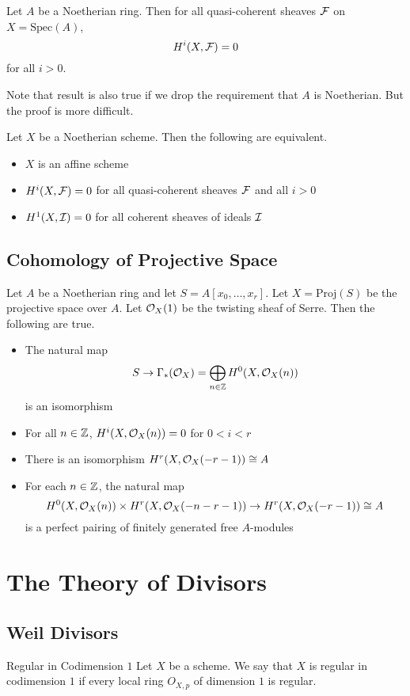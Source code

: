 \documentclass[a4paper]{article}
\begin{document}
\begin{thm}{}{} Let $A$ be a Noetherian ring. Then for all quasi-coherent sheaves $\mathcal{F}$ on $X=\text{Spec}(A)$, $$H^i(X,\mathcal{F})=0$$ for all $i>0$. 
\end{thm}

Note that result is also true if we drop the requirement that $A$ is Noetherian. But the proof is more difficult. 

\begin{thm}{}{} Let $X$ be a Noetherian scheme. Then the following are equivalent. 
\begin{itemize}
\item $X$ is an affine scheme
\item $H^i(X,\mathcal{F})=0$ for all quasi-coherent sheaves $\mathcal{F}$ and all $i>0$
\item $H^1(X,\mathcal{I})=0$ for all coherent sheaves of ideals $\mathcal{I}$
\end{itemize}
\end{thm}

\subsection{Cohomology of Projective Space}
\begin{thm}{}{} Let $A$ be a Noetherian ring and let $S=A[x_0,\dots,x_r]$. Let $X=\text{Proj}(S)$ be the projective space over $A$. Let $\mathcal{O}_X(1)$ be the twisting sheaf of Serre. Then the following are true. 
\begin{itemize}
\item The natural map $$S\to\Gamma_\ast(\mathcal{O}_X)=\bigoplus_{n\in\mathbb{Z}}H^0(X,\mathcal{O}_X(n))$$ is an isomorphism
\item For all $n\in\mathbb{Z}$, $H^i(X,\mathcal{O}_X(n))=0$ for $0<i<r$
\item There is an isomorphism $H^r(X,\mathcal{O}_X(-r-1))\cong A$
\item For each $n\in\mathbb{Z}$, the natural map $$H^0(X,\mathcal{O}_X(n))\times H^r(X,\mathcal{O}_X(-n-r-1))\to H^r(X,\mathcal{O}_X(-r-1))\cong A$$ is a perfect pairing of finitely generated free $A$-modules
\end{itemize}
\end{thm}


\pagebreak
\section{The Theory of Divisors}
\subsection{Weil Divisors}
\begin{defn}{Regular in Codimension $1$}{} Let $X$ be a scheme. We say that $X$ is regular in codimension $1$ if every local ring $O_{X,p}$ of dimension $1$ is regular. 
\end{defn}
\end{document}
